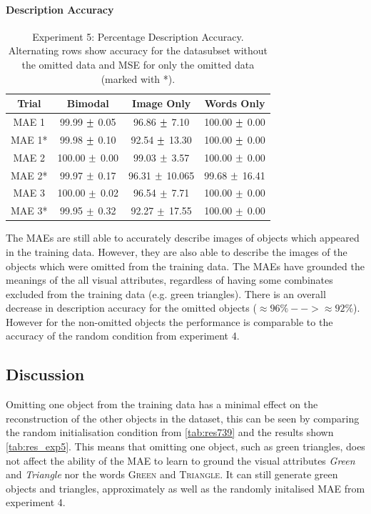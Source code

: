 \paragraph{Description Accuracy}
\begin{table}[h!]
\centering
	\begin{tabular}{|c|c|c|c|}
	\hline
\textbf{Trial}	 & 	\textbf{Bimodal} & \textbf{Image Only} 	& 	\textbf{Words Only} \\ \hline
MAE 1	&	99.99	$\mypm$	0.05	&	96.86	$\mypm$	7.10	&	100.00	$\mypm$	0.00	\\ \hline
MAE 1*	&	99.98	$\mypm$	0.10	&	92.54	$\mypm$	13.30	&	100.00	$\mypm$	0.00	\\ \hline
MAE 2	&	100.00	$\mypm$	0.00	&	99.03	$\mypm$	3.57	&	100.00	$\mypm$	0.00	\\ \hline
MAE 2*	&	99.97	$\mypm$	0.17	&	96.31	$\mypm$	10.065	&	99.68	$\mypm$	16.41	\\ \hline
MAE 3	&	100.00	$\mypm$	0.02	&	96.54	$\mypm$	7.71	&	100.00	$\mypm$	0.00	\\ \hline

MAE 3*	&	99.95	$\mypm$	0.32	&	92.27	$\mypm$	17.55	&	100.00	$\mypm$	0.00	\\ \hline

	\end{tabular}
\caption{Experiment 5: Percentage Description Accuracy. Alternating rows show accuracy for the datasubset without the omitted data and MSE for only the omitted data (marked with *).}
\label{tab:res_exp5_acc}
\end{table}

The \acp{MAE} are still able to accurately describe images of objects which appeared in the training data. However, they are also able to describe the images of the objects which were omitted from the training data. The \acp{MAE} have grounded the meanings of the all visual attributes, regardless of having some combinates excluded from the training data (e.g. green triangles). There is an overall decrease in description accuracy for the omitted objects ($\approx 96 \% --> \approx 92 \%$). However for the non-omitted objects the performance is comparable to the accuracy of the random condition from experiment 4.


\subsection{Discussion}
Omitting one object from the training data has a minimal effect on the reconstruction of the other objects in the dataset, this can be seen by comparing the random initialisation condition from \autoref{tab:res739} and the results shown \autoref{tab:res_exp5}. This means that omitting one object, such as green triangles, does not affect the ability of the \ac{MAE} to learn to ground the visual attributes \textit{Green} and \textit{Triangle} nor the words \textsc{Green} and \textsc{Triangle}. It can still generate green objects and triangles, approximately as well as the randomly initalised MAE from experiment 4.

